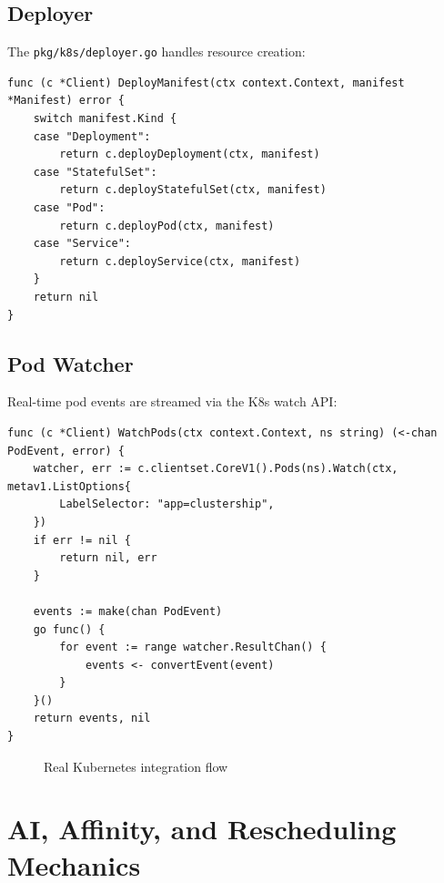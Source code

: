 \documentclass[11pt]{article}
\begin{document}
\subsection{Deployer}

The \texttt{pkg/k8s/deployer.go} handles resource creation:

\begin{lstlisting}
func (c *Client) DeployManifest(ctx context.Context, manifest *Manifest) error {
    switch manifest.Kind {
    case "Deployment":
        return c.deployDeployment(ctx, manifest)
    case "StatefulSet":
        return c.deployStatefulSet(ctx, manifest)
    case "Pod":
        return c.deployPod(ctx, manifest)
    case "Service":
        return c.deployService(ctx, manifest)
    }
    return nil
}
\end{lstlisting}

\subsection{Pod Watcher}

Real-time pod events are streamed via the K8s watch API:

\begin{lstlisting}
func (c *Client) WatchPods(ctx context.Context, ns string) (<-chan PodEvent, error) {
    watcher, err := c.clientset.CoreV1().Pods(ns).Watch(ctx, metav1.ListOptions{
        LabelSelector: "app=clustership",
    })
    if err != nil {
        return nil, err
    }

    events := make(chan PodEvent)
    go func() {
        for event := range watcher.ResultChan() {
            events <- convertEvent(event)
        }
    }()
    return events, nil
}
\end{lstlisting}

\begin{figure}[H]
    \centering
    \caption{Real Kubernetes integration flow}
    \label{fig:k8sflow}
\end{figure}


\section{AI, Affinity, and Rescheduling Mechanics}
\end{document}
